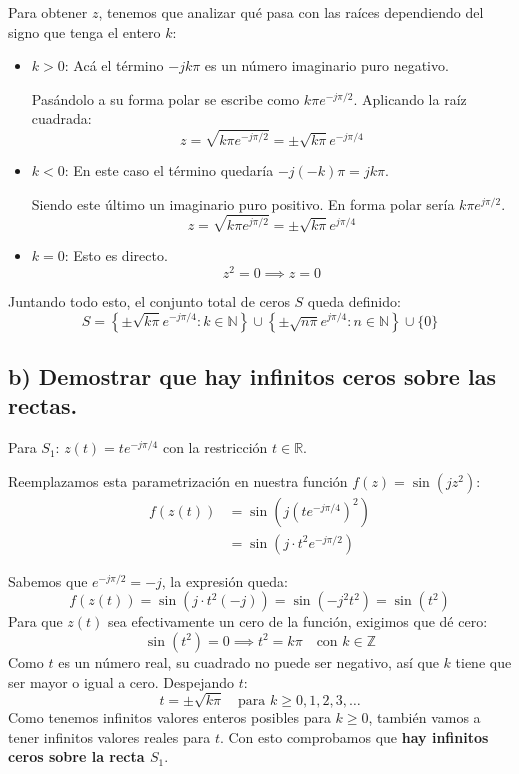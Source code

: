 \documentclass[a4paper, 12pt]{article}
\begin{document}
Para obtener $z$, tenemos que analizar qué pasa con las raíces dependiendo del signo que tenga 
el entero $k$:
\begin{itemize}
    \item $k > 0$: Acá el término $-jk\pi$ es un número imaginario puro negativo. 

    \vspace{0.1cm}
    
    Pasándolo a su forma polar se escribe como $k\pi e^{-j\pi/2}$. Aplicando la raíz cuadrada:
    \[ z = \sqrt{k\pi e^{-j\pi/2}} = \pm \sqrt{k\pi} e^{-j\pi/4} \]
    
    \item $k < 0$: En este caso el término quedaría $-j(-k)\pi = jk\pi$. 

    \vspace{0.1cm}
    
    Siendo este último un imaginario puro positivo. En forma polar sería $k\pi e^{j\pi/2}$.
    \[ z = \sqrt{k\pi e^{j\pi/2}} = \pm \sqrt{k\pi} e^{j\pi/4} \]
    
    \item $k = 0$: Esto es directo.
    \[ z^2 = 0 \implies z = 0 \]
\end{itemize}

Juntando todo esto, el conjunto total de ceros $S$ queda definido:
\[ S = \left\{ \pm \sqrt{k\pi} e^{-j\pi/4} : k \in \mathbb{N} \right\} \cup \left\{ \pm \sqrt{n\pi} e^{j\pi/4} : n \in \mathbb{N} \right\} \cup \{0\} \]

\vspace{0.5cm}

\subsection{b) Demostrar que hay infinitos ceros sobre las rectas.}

Para $S_1$: \qquad $z(t) = t e^{-j\pi/4}$ con la restricción $t \in \mathbb{R}$. 

\vspace{0.4cm}

Reemplazamos esta parametrización  en nuestra función $f(z) = \sin(jz^2)$:
\begin{align*}
    f(z(t)) &= \sin \left( j (t e^{-j\pi/4})^2 \right) \\
            &= \sin \left( j \cdot t^2 e^{-j\pi/2} \right)
\end{align*}	
	
Sabemos que $e^{-j\pi/2} = -j$, la expresión queda:
\[ f(z(t)) = \sin \left( j \cdot t^2 (-j) \right) = \sin(-j^2 t^2) = \sin(t^2) \]
Para que $z(t)$ sea efectivamente un cero de la función, exigimos que dé cero:
\[ \sin(t^2) = 0 \implies t^2 = k\pi \quad \text{con } k \in \mathbb{Z} \]
Como $t$ es un número real, su cuadrado no puede ser negativo, así que $k$ tiene que ser mayor o igual a cero. Despejando $t$:
\[ t = \pm \sqrt{k\pi} \quad \text{para } k \ge 0, 1, 2, 3, \dots \]
Como tenemos infinitos valores enteros posibles para $k \ge 0$, también vamos a tener infinitos valores reales para $t$. Con esto comprobamos que \textbf{hay infinitos ceros sobre la recta $S_1$}.
\end{document}
